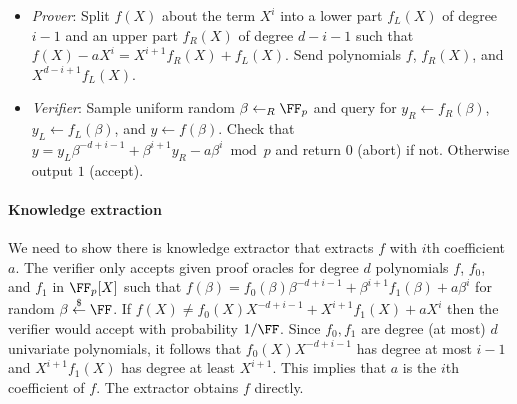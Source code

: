 \begin{itemize}

\item \emph{Prover}: Split $f(X)$ about the term $X^i$ into a lower part $f_L(X)$ of degree $i -1$ and an upper part $f_R(X)$ of degree $d - i - 1$ such that $f(X) - a X^i = X^{i+1} f_R(X) + f_L(X)$. Send polynomials $f$, $f_R(X)$, and $X^{d - i + 1}f_L(X)$. 


\item \emph{Verifier}: Sample uniform random  $\beta \leftarrow_R \FF_p$ and query for $y_R \leftarrow f_R(\beta)$, $y_L \leftarrow f_L(\beta)$, and $y \leftarrow f(\beta)$. 
Check that $y = y_L \beta^{-d + i - 1} + \beta^{i+1} y_R - a \beta^i \bmod p$ and return $0$ (abort) if not. Otherwise output $1$ (accept). 



\end{itemize}

\paragraph{Knowledge extraction} We need to show there is knowledge extractor that extracts $f$ with $i$th coefficient $a$. The verifier only accepts given proof oracles for degree $d$ polynomials $f$, $f_0$, and $f_1$ in $\FF_p[X]$ such that $f(\beta) = f_0(\beta) \beta^{-d + i - 1} + \beta^{i+1} f_1(\beta) + a\beta^i$ for random $\beta \sample \FF$. If $f(X) \neq f_0(X) X^{-d + i -1} + X^{i+1}f_1(X) + aX^i$ then the verifier would accept with probability $1/\FF$. Since $f_0, f_1$ are degree (at most) $d$ univariate polynomials, it follows that $f_0(X) X^{-d + i -1}$ has degree at most $i -1$ and $X^{i+1}f_1(X)$ has degree at least $X^{i+1}$. This implies that $a$ is the $i$th coefficient of $f$. The extractor obtains $f$ directly. 

